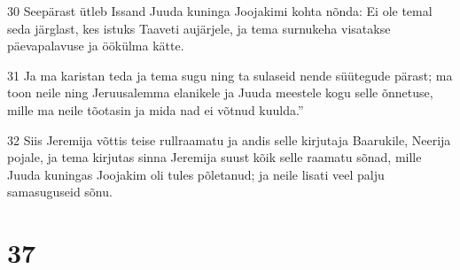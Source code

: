 \par 30 Seepärast ütleb Issand Juuda kuninga Joojakimi kohta nõnda: Ei ole temal seda järglast, kes istuks Taaveti aujärjele, ja tema surnukeha visatakse päevapalavuse ja öökülma kätte.
\par 31 Ja ma karistan teda ja tema sugu ning ta sulaseid nende süütegude pärast; ma toon neile ning Jeruusalemma elanikele ja Juuda meestele kogu selle õnnetuse, mille ma neile tõotasin ja mida nad ei võtnud kuulda.”
\par 32 Siis Jeremija võttis teise rullraamatu ja andis selle kirjutaja Baarukile, Neerija pojale, ja tema kirjutas sinna Jeremija suust kõik selle raamatu sõnad, mille Juuda kuningas Joojakim oli tules põletanud; ja neile lisati veel palju samasuguseid sõnu.

\chapter{37}

